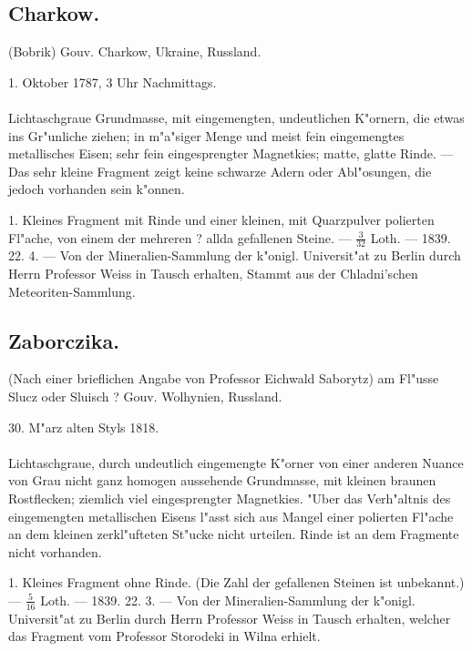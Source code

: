 \documentclass[a4paper, 11pt, oneside, polutonikogreek, german]{article}
\begin{document}
\subsection{Charkow.}
\begin{center}
\small
(Bobrik) Gouv. Charkow, Ukraine, Russland.

1. Oktober 1787, 3 Uhr Nachmittags.
\end{center}
\paragraph{}
Lichtaschgraue Grundmasse, mit eingemengten, undeutlichen K"ornern, die etwas ins Gr"unliche ziehen; in m"a"siger Menge und meist fein eingemengtes metallisches Eisen; sehr fein eingesprengter Magnetkies; matte, glatte Rinde. --- Das sehr kleine Fragment zeigt keine schwarze Adern oder Abl"osungen, die jedoch vorhanden sein k"onnen.

1. Kleines Fragment mit Rinde und einer kleinen, mit Quarzpulver polierten Fl"ache, von einem der mehreren ? allda gefallenen Steine. --- $\frac{3}{32}$ Loth. --- 1839. 22. 4. --- Von der Mineralien-Sammlung der k"onigl. Universit"at zu Berlin durch Herrn Professor Weiss in Tausch erhalten, Stammt aus der Chladni'schen Meteoriten-Sammlung.
\subsection{Zaborczika.}
\begin{center}
\small
(Nach einer brieflichen Angabe von Professor Eichwald Saborytz) am Fl"usse Slucz oder Sluisch ? Gouv. Wolhynien, Russland.

30. M"arz alten Styls 1818.
\end{center}
\paragraph{}
Lichtaschgraue, durch undeutlich eingemengte K"orner von einer anderen Nuance von Grau nicht ganz homogen aussehende Grundmasse, mit kleinen braunen Rostflecken; ziemlich viel eingesprengter Magnetkies. "Uber das Verh"altnis des eingemengten metallischen Eisens l"asst sich aus Mangel einer polierten Fl"ache an dem kleinen zerkl"ufteten St"ucke nicht urteilen. Rinde ist an dem Fragmente nicht vorhanden.

1. Kleines Fragment ohne Rinde. (Die Zahl der gefallenen Steinen ist unbekannt.) --- $\frac{5}{16}$ Loth. --- 1839. 22. 3. --- Von der Mineralien-Sammlung der k"onigl. Universit"at zu Berlin durch Herrn Professor Weiss in Tausch erhalten, welcher das Fragment vom Professor Storodeki in Wilna erhielt.
\end{document}
